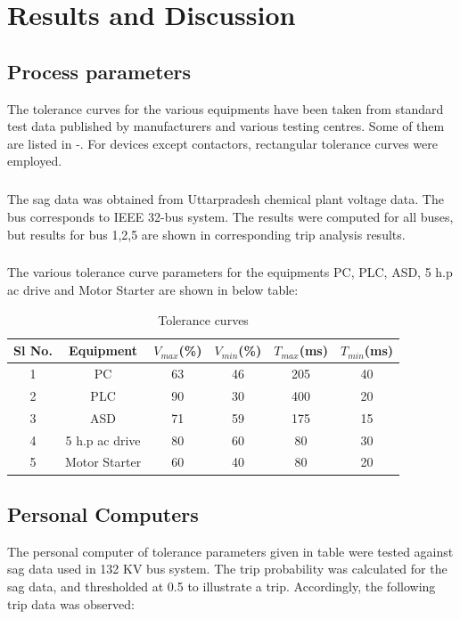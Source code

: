 \documentclass[17pt,a4paper]{extreport}
\begin{document}
	\chapter[Results and Discussion]{Results and Discussion}
	\section[Process parameters]{Process parameters}
	The tolerance curves for the various equipments have been taken from standard test data published by manufacturers and various testing centres. Some of them are listed in \cite{Voltage
sag analysis case studies}-\cite{A probabilistic method for comprehensive voltage sag
management in power distribution systems}. For devices except contactors, rectangular tolerance curves were employed. 
\paragraph{} The sag data was obtained from Uttarpradesh chemical plant voltage data.
The bus corresponds to IEEE 32-bus system. The results were computed for all buses, but results for bus 1,2,5 are shown in corresponding trip analysis results.
\paragraph{} The various tolerance curve parameters for the equipments PC, PLC, ASD, 5 h.p ac drive and Motor Starter are shown in below table:
\begin{center}
\begin{table}
\begin{tabular}{|c|c|c|c|c|c|}
\hline
	Sl No. & Equipment & $V_{max}$(\%) & $V_{min}$(\%)& $T_{max}$(ms) & $T_{min}$(ms)\\
	\hline
	1 & PC & 63 & 46 & 205 & 40\\ 
	\hline
	2 & PLC & 90 & 30 & 400 & 20\\
	\hline 
	3 & ASD & 71 & 59 & 175 & 15\\
	\hline
	4 & 5 h.p ac drive &80 & 60 & 80 & 30\\
	\hline
	5 & Motor Starter & 60& 40 & 80& 20\\
	\hline

\end{tabular}
\caption{Tolerance curves}
\label{tab:tolerance_r}
\end{table}
\end{center}
\section[Personal Computers]{Personal Computers}
	The personal computer of tolerance parameters given in table were tested against sag data used in 132 KV bus system. The trip probability was calculated for the sag data, and thresholded at 0.5 to illustrate a trip. Accordingly, the following trip data was observed:
\end{document}
